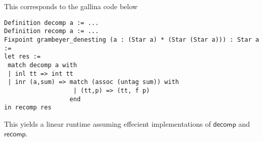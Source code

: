 \documentclass[a4paper,UKenglish,cleveref, autoref, thm-restate]{lipics-v2021}
\begin{document}
\begin{example}[Grabmeyer]
This corresponds to the gallina code below
\begin{verbatim}
Definition decomp a := ...
Definition recomp a := ...
Fixpoint grambeyer_denesting (a : (Star a) * (Star (Star a))) : Star a := 
let res := 
 match decomp a with 
 | inl tt => int tt 
 | inr (a,sum) => match (assoc (untag sum)) with 
                   | (tt,p) => (tt, f p)
                  end 
in recomp res
\end{verbatim}
This yields a linear runtime assuming effecient implementations of $\mathsf{decomp}$ and $\mathsf{recomp}$.
\end{example}
\end{document}
